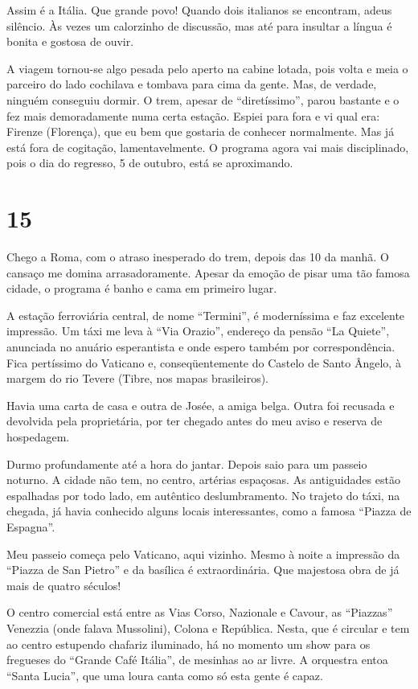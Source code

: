 Assim é a Itália. Que grande povo! Quando dois italianos se encontram, adeus silêncio. Às vezes um calorzinho de discussão, mas até para insultar a língua é bonita e gostosa de ouvir.

A viagem tornou-se algo pesada pelo aperto na cabine lotada, pois volta e meia o parceiro do lado cochilava e tombava para cima da gente. Mas, de verdade, ninguém conseguiu dormir. O trem, apesar de ``diretíssimo'', parou bastante e o fez mais demoradamente numa certa estação. Espiei para fora e vi qual era: Firenze (Florença), que eu bem que gostaria de conhecer normalmente. Mas já está fora de cogitação, lamentavelmente. O programa agora vai mais disciplinado, pois o dia do regresso, 5 de outubro, está se aproximando.

\section*{15 \adfflatleafright {}}
Chego a Roma, com o atraso inesperado do trem, depois das 10 da manhã. O cansaço me domina arrasadoramente. Apesar da emoção de pisar uma tão famosa cidade, o programa é banho e cama em primeiro lugar.

A estação ferroviária central, de nome ``Termini'', é moderníssima e faz excelente impressão. Um táxi me leva à ``Via Orazio'', endereço da pensão ``La Quiete'', anunciada no anuário esperantista e onde espero também por correspondência. Fica pertíssimo do Vaticano e, conseqüentemente do Castelo de Santo Ângelo, à margem do rio Tevere (Tibre, nos mapas brasileiros).

Havia uma carta de casa e outra de Josée, a amiga belga. Outra foi recusada e devolvida pela proprietária, por ter chegado antes do meu aviso e reserva de hospedagem.

Durmo profundamente até a hora do jantar. Depois saio para um passeio noturno. A cidade não tem, no centro, artérias espaçosas. As antiguidades estão espalhadas por todo lado, em autêntico deslumbramento. No trajeto do táxi, na chegada, já havia conhecido alguns locais interessantes, como a famosa ``Piazza de Espagna''.

Meu passeio começa pelo Vaticano, aqui vizinho. Mesmo à noite a impressão da ``Piazza de San Pietro'' e da basílica é extraordinária. Que majestosa obra de já mais de quatro séculos!

O centro comercial está entre as Vias Corso, Nazionale e Cavour, as ``Piazzas'' Venezzia (onde falava Mussolini), Colona e República. Nesta, que é circular e tem ao centro estupendo chafariz iluminado, há no momento um show para os fregueses do ``Grande Café Itália'', de mesinhas ao ar livre. A orquestra entoa ``Santa Lucia'', que uma loura canta como só esta gente é capaz.

